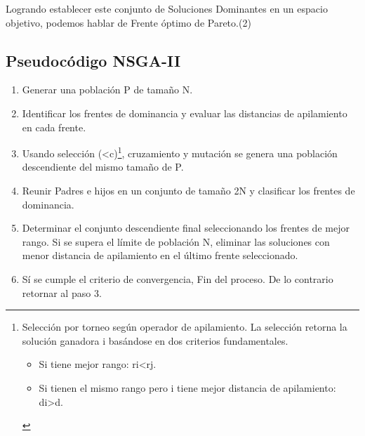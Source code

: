 Logrando establecer este conjunto de Soluciones Dominantes en un espacio objetivo, podemos hablar de Frente óptimo de Pareto.(2)


\subsection{Pseudocódigo NSGA-II \cite{pdf:nsga-ii}}

\begin{enumerate}
	\item Generar una población P de tamaño N. 
	\item Identificar los frentes de dominancia y evaluar las 
	distancias de apilamiento en cada frente. 
	\item Usando selección (<c)\footnote{Selección por torneo según operador de 
		apilamiento. La selección retorna la solución ganadora i basándose en 
		dos criterios fundamentales.  
		\begin{itemize}
			\item Si tiene mejor rango: ri<rj.
			\item Si tienen el mismo rango pero i tiene mejor distancia de apilamiento: di>d.
		\end{itemize}
	}, cruzamiento y mutación se 
	genera una población descendiente del mismo 
	tamaño de P.  	
	\item Reunir Padres e hijos en un conjunto de tamaño 2N y 
	clasificar los frentes de dominancia. 
	\item Determinar el conjunto descendiente final 
	seleccionando los frentes de mejor rango. Si se 
	supera el límite de población N, eliminar las 
	soluciones con menor distancia de apilamiento en el 
	último frente seleccionado. 
	\item Sí se cumple el criterio de convergencia, Fin del 
	proceso. De lo contrario retornar al paso 3.
\end{enumerate}